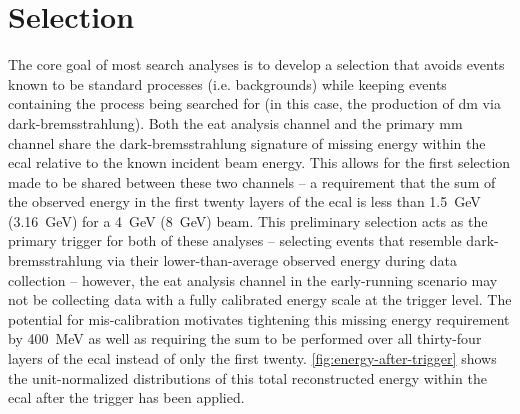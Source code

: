 \section{Selection}
The core goal of most search analyses is to develop a selection that avoids events known to be
standard processes (i.e. backgrounds) while keeping events containing the process being searched
for (in this case, the production of \ac{dm} via dark-bremsstrahlung).
Both the \ac{eat} analysis channel and the primary \ac{mm} channel share the dark-bremsstrahlung
signature of missing energy within the \ac{ecal} relative to the known incident beam energy.
This allows for the first selection made to be shared between these two channels -- 
a requirement that the sum of the observed energy in the first twenty layers of the \ac{ecal}
is less than \qty{1.5}{\GeV} (\qty{3.16}{\GeV}) for a \qty{4}{\GeV} (\qty{8}{\GeV}) beam.
This preliminary selection acts as the primary trigger for both of these analyses --
selecting events that resemble dark-bremsstrahlung via their lower-than-average
observed energy during data collection -- however, the \ac{eat} analysis channel in the early-running scenario
may not be collecting data with a fully calibrated energy scale at the trigger level.
The potential for mis-calibration motivates tightening this missing energy requirement
by \qty{400}{\mega\electronvolt} as well as requiring the sum to be performed over all thirty-four
layers of the \ac{ecal} instead of only the first twenty.
\cref{fig:energy-after-trigger} shows the unit-normalized distributions of this total reconstructed
energy within the \ac{ecal} after the trigger has been applied.

